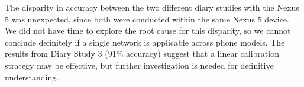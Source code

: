 The disparity in accuracy between the two different diary studies with the Nexus 5 was unexpected,
since both were conducted within the same Nexus 5 device. We did not have time to explore the root
cause for this disparity, so we cannot conclude definitely if a single network is applicable across phone models. 
The results from Diary Study 3 ($91\%$ accuracy) suggest that a linear calibration
strategy may be effective, but further investigation is needed for definitive understanding.
